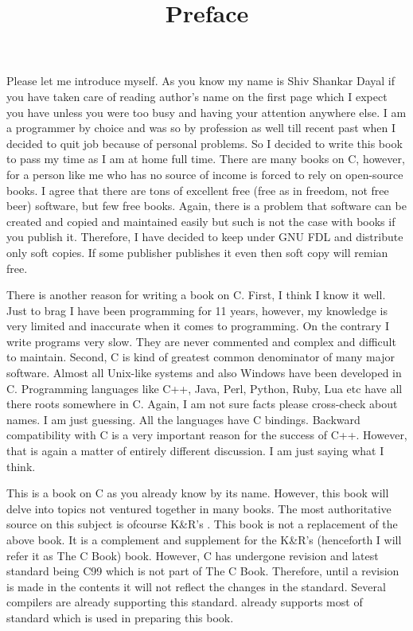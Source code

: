 \title{Preface}
Please let me introduce myself. As you know my name is Shiv Shankar Dayal if
you have taken care of reading author's name on the first page which I expect
you have unless you were too busy and having your attention anywhere else.
I am a programmer by choice and was so by profession as well till recent past
when I decided to quit job because of personal problems. So I decided to write
this book to pass my time as I am at home full time. There are many books on C,
however, for a person like me who has no source of income is forced to rely
on open-source books. I agree that there are tons of excellent free (free as in
freedom, not free beer) software, but few free books. Again, there is a problem
that software can be created and copied and maintained easily but such is not
the case with books if you publish it. Therefore, I have decided to keep under
GNU FDL and distribute only soft copies. If some publisher publishes it even
then soft copy will remian free.

There is another reason for writing a book on C. First, I think I know it well.
Just to brag I have been programming for 11 years, however, my knowledge is
very limited and inaccurate when it comes to programming. On the contrary I
write programs very slow. They are never commented and complex and difficult
to maintain. Second, C is kind of greatest common denominator of many major
software. Almost all Unix-like systems and also Windows have been developed
in C. Programming languages like C++, Java, Perl, Python, Ruby, Lua etc have all
there roots somewhere in C. Again, I am not sure facts please cross-check
about names. I am just guessing. All the languages have C bindings. Backward
compatibility with C is a very important reason for the success of C++.
However, that is again a matter of entirely different discussion. I am just
saying what I think.

This is a book on C as you already know by its name. However, this book will
delve into topics not ventured together in many books. The most authoritative
source on this subject is ofcourse K\&R's . This book is not a replacement of the above book. It is a complement
and supplement for the K\&R's (henceforth I will refer it as The C Book) book.
However, C has undergone revision and latest standard being C99 which is not
part of The C Book. Therefore, until a revision is made in the contents it
will not reflect the changes in the standard. Several compilers are already
supporting this standard.  already supports most of standard which is
used in preparing this book.

